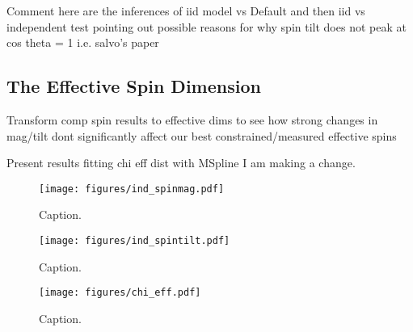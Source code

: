 Comment here are the inferences of iid model vs Default and then iid vs independent test pointing out possible reasons for why spin tilt 
does not peak at cos theta = 1 i.e. salvo's paper

\subsection{The Effective Spin Dimension}

Transform comp spin results to effective dims to see how strong changes in mag/tilt dont significantly affect our best constrained/measured
effective spins

Present results fitting chi eff dist with MSpline I am making a change. 

\begin{figure}
    \texttt{[image: figures/ind\_spinmag.pdf]}
    \caption{Caption.}
    \label{fig:ind_spinmag_dist}
\end{figure}

\begin{figure}
        \texttt{[image: figures/ind\_spintilt.pdf]}
        \caption{Caption.}
        \label{fig:ind_spintilt_dist}
\end{figure}


\begin{figure}
    \texttt{[image: figures/chi\_eff.pdf]}
    \caption{Caption.}
    \label{fig:chieff_dist}
\end{figure}